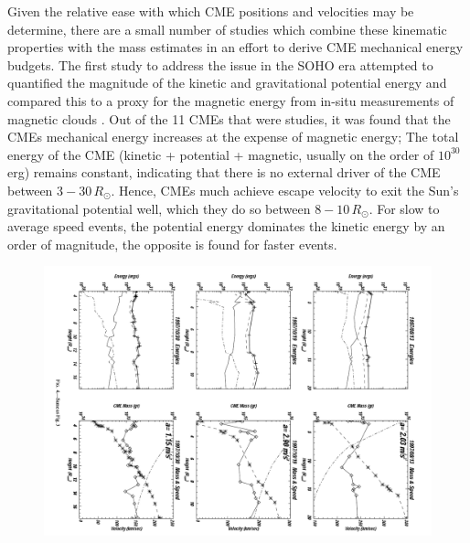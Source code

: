 Given the relative ease with which CME positions and velocities may be determine, there are a small number of studies which combine these kinematic properties with the mass estimates in an effort to derive CME mechanical energy budgets. The first study to address the issue in the SOHO era attempted to quantified the magnitude of the kinetic and gravitational potential energy and compared this to a proxy for the magnetic energy from in-situ measurements of magnetic clouds \citep{vou00}. Out of the 11 CMEs that were studies, it was found that the CMEs mechanical energy increases at the expense of magnetic energy; The total energy of the CME (kinetic + potential + magnetic, usually on the order of $10^{30}$\,erg) remains constant, indicating that there is no external driver of the CME between $3-30\,R_{\odot}$. Hence, CMEs much achieve escape velocity to exit the Sun's gravitational potential well, which they do so between $8-10\,R_{\odot}$. For slow to average speed events, the potential energy dominates the kinetic energy by an order of magnitude, the opposite is found for faster events. 
\begin{figure}[h!]
\begin{center}
\includegraphics[scale=0.45, angle=90]{images/cme_energies}
\caption{\citep{vou00}}
\end{center}
\label{fig:cme_energies}
\end{figure}
\clearpage

